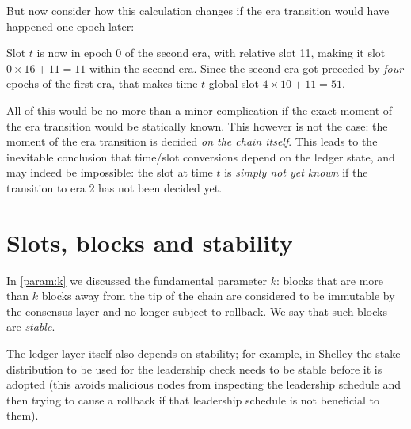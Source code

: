 But now consider how this calculation changes if the era transition would have
happened one epoch later:
%
\begin{center}
\end{center}
%
Slot $t$ is now in epoch 0 of the second era, with relative
slot 11, making it slot $0 \times 16 + 11 = 11$ within the second era.
Since the second era got preceded by \emph{four} epochs of the first era,
that makes time $t$ global slot $4 \times 10 + 11 = 51$.

All of this would be no more than a minor complication if the exact moment of
the era transition would be statically known. This however is not the case: the
moment of the era transition is decided \emph{on the chain itself}. This leads
to the inevitable conclusion that time/slot conversions depend on the ledger
state, and may indeed be impossible: the slot at time $t$ is \emph{simply not
yet known} if the transition to era 2 has not been decided yet.

\section{Slots, blocks and stability}
\label{time:slots-vs-blocks}

In \cref{param:k} we discussed the fundamental parameter $k$: blocks that are
more than $k$ blocks away from the tip of the chain are considered to be
immutable by the consensus layer and no longer subject to rollback. We say that
such blocks are \emph{stable}.

The ledger layer itself also depends on stability; for example, in Shelley the
stake distribution to be used for the leadership check needs to be stable before
it is adopted (this avoids malicious nodes from inspecting the leadership
schedule and then trying to cause a rollback if that leadership schedule is not
beneficial to them).

